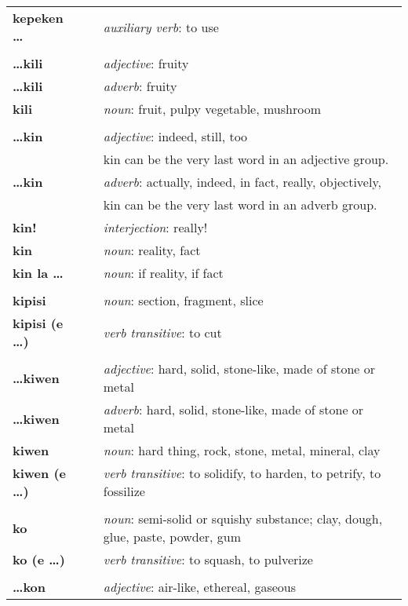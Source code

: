 \begin{supertabular}{p{2,5cm}|ll}
\textbf{kepeken \dots} && \textit{auxiliary verb}: to use \\ 
 && \\ %
\textbf{\dots kili} && \textit{adjective}: fruity \\ 
\textbf{\dots kili} && \textit{adverb}: fruity \\ 
\textbf{kili} && \textit{noun}: fruit, pulpy vegetable, mushroom \\ 
 && \\ %
\textbf{\dots kin} && \textit{adjective}: indeed, still, too \\ && kin can be the very last word in an adjective group. \\ 
\textbf{\dots kin} && \textit{adverb}: actually, indeed, in fact, really, objectively, \\ && kin can be the very last word in an adverb group. \\
\textbf{kin!} && \textit{interjection}: really! \\ 
\textbf{kin} && \textit{noun}: reality, fact \\  
\textbf{kin la \dots} && \textit{noun}: if reality, if fact \\  
 && \\ %
\textbf{kipisi } && \textit{noun}: section, fragment, slice \\ 
\textbf{kipisi (e \dots)} && \textit{verb transitive}: to cut \\ 
 && \\ %
\textbf{\dots kiwen} && \textit{adjective}: hard, solid, stone-like, made of stone or metal \\ 
\textbf{\dots kiwen} && \textit{adverb}: hard, solid, stone-like, made of stone or metal \\ 
\textbf{kiwen} && \textit{noun}: hard thing, rock, stone, metal, mineral, clay \\ 
\textbf{kiwen (e \dots)} && \textit{verb transitive}: to solidify, to harden, to petrify, to fossilize \\ 
 && \\ %
\textbf{ko} && \textit{noun}: semi-solid or squishy substance; clay, dough, glue, paste, powder, gum \\ 
\textbf{ko (e \dots)} && \textit{verb transitive}: to squash, to pulverize \\ 
 && \\ %
\textbf{\dots kon} && \textit{adjective}: air-like, ethereal, gaseous \\ 

\end{supertabular}
